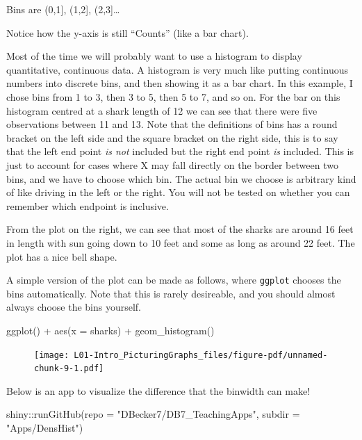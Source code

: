 \documentclass[
  letterpaper,
  DIV=11,
  numbers=noendperiod]{scrreprt}
\newenvironment{Shaded}{\begin{snugshade}}{\end{snugshade}}
\newcommand{\AttributeTok}[1]{\textcolor[rgb]{0.40,0.45,0.13}{#1}}
\newcommand{\FunctionTok}[1]{\textcolor[rgb]{0.28,0.35,0.67}{#1}}
\newcommand{\NormalTok}[1]{\textcolor[rgb]{0.00,0.23,0.31}{#1}}
\newcommand{\SpecialCharTok}[1]{\textcolor[rgb]{0.37,0.37,0.37}{#1}}
\newcommand{\StringTok}[1]{\textcolor[rgb]{0.13,0.47,0.30}{#1}}
\begin{document}
Bins are (0,1{]}, (1,2{]}, (2,3{]}\ldots{}

Notice how the y-axis is still ``Counts'' (like a bar chart).

Most of the time we will probably want to use a histogram to display
quantitative, continuous data. A histogram is very much like putting
continuous numbers into discrete bins, and then showing it as a bar
chart. In this example, I chose bins from 1 to 3, then 3 to 5, then 5 to
7, and so on. For the bar on this histogram centred at a shark length of
12 we can see that there were five observations between 11 and 13. Note
that the definitions of bins has a round bracket on the left side and
the square bracket on the right side, this is to say that the left end
point \emph{is not} included but the right end point \emph{is} included.
This is just to account for cases where X may fall directly on the
border between two bins, and we have to choose which bin. The actual bin
we choose is arbitrary kind of like driving in the left or the right.
You will not be tested on whether you can remember which endpoint is
inclusive.

From the plot on the right, we can see that most of the sharks are
around 16 feet in length with sun going down to 10 feet and some as long
as around 22 feet. The plot has a nice bell shape.

A simple version of the plot can be made as follows, where
\texttt{ggplot} chooses the bins automatically. Note that this is rarely
desireable, and you should almost always choose the bins yourself.

\begin{Shaded}
\begin{Highlighting}[]
\FunctionTok{ggplot}\NormalTok{() }\SpecialCharTok{+} 
    \FunctionTok{aes}\NormalTok{(}\AttributeTok{x =}\NormalTok{ sharks) }\SpecialCharTok{+}
    \FunctionTok{geom\_histogram}\NormalTok{()}
\end{Highlighting}
\end{Shaded}

\begin{figure}[H]

{\centering \texttt{[image: L01-Intro\_PicturingGraphs\_files/figure-pdf/unnamed-chunk-9-1.pdf]}

}

\end{figure}

Below is an app to visualize the difference that the binwidth can make!

\begin{Shaded}
\begin{Highlighting}[]
\NormalTok{shiny}\SpecialCharTok{::}\FunctionTok{runGitHub}\NormalTok{(}\AttributeTok{repo =} \StringTok{"DBecker7/DB7\_TeachingApps"}\NormalTok{, }
    \AttributeTok{subdir =} \StringTok{"Apps/DensHist"}\NormalTok{)}
\end{Highlighting}
\end{Shaded}
\end{document}
